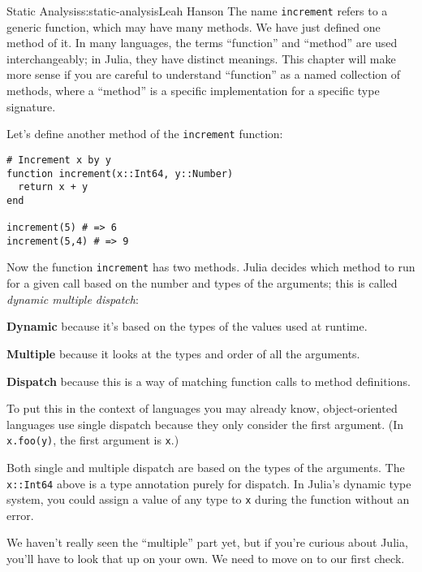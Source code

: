 \begin{aosachapter}{Static Analysis}{s:static-analysis}{Leah Hanson}
The name \texttt{increment} refers to a generic function, which may have
many methods. We have just defined one method of it. In many languages,
the terms ``function'' and ``method'' are used interchangeably; in
Julia, they have distinct meanings. This chapter will make more sense if
you are careful to understand ``function'' as a named collection of
methods, where a ``method'' is a specific implementation for a specific
type signature.

Let's define another method of the \texttt{increment} function:

\begin{verbatim}
# Increment x by y
function increment(x::Int64, y::Number)
  return x + y
end

increment(5) # => 6
increment(5,4) # => 9
\end{verbatim}

Now the function \texttt{increment} has two methods. Julia decides which
method to run for a given call based on the number and types of the
arguments; this is called \emph{dynamic multiple dispatch}:

\begin{aosaitemize}

\item
  \textbf{Dynamic} because it's based on the types of the values used at
  runtime.
\item
  \textbf{Multiple} because it looks at the types and order of all the
  arguments.
\item
  \textbf{Dispatch} because this is a way of matching function calls to
  method definitions.
\end{aosaitemize}

To put this in the context of languages you may already know,
object-oriented languages use single dispatch because they only consider
the first argument. (In \texttt{x.foo(y)}, the first argument is
\texttt{x}.)

Both single and multiple dispatch are based on the types of the
arguments. The \texttt{x::Int64} above is a type annotation purely for
dispatch. In Julia's dynamic type system, you could assign a value of
any type to \texttt{x} during the function without an error.

We haven't really seen the ``multiple'' part yet, but if you're curious
about Julia, you'll have to look that up on your own. We need to move on
to our first check.

\label{checking-the-types-of-variables-in-loops}


\end{aosachapter}
